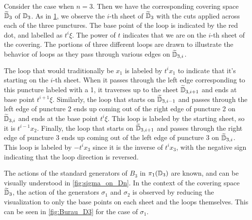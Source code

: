 \begin{example}\label{ex:Burau_D3}
    Consider the case when $n=3$. Then we have the corresponding covering space $\widetilde{\mathbb{D}}_3$ of $\mathbb{D}_3$. As in \cref{fig:D3_cuts}, we observe the $i$-th sheet of $\widetilde{\mathbb{D}}_3$ with the cuts applied across each of the three punctures. The base point of the loop is indicated by the red dot, and labelled as $t^i\xi$. The power of $t$ indicates that we are on the $i$-th sheet of the covering. The portions of three different loops are drawn to illustrate the behavior of loops as they pass through various edges on $\widetilde{\mathbb{D}}_{3,i}$.
    
    The loop that would traditionally be $x_1$ is labeled by $t^i x_1$ to indicate that it's starting on the $i$-th sheet. When it passes through the left edge corresponding to this puncture labeled with a 1, it traverses up to the sheet $\widetilde{\mathbb{D}}_{3,i+1}$ and ends at base point $t^{i+1}\xi$. Similarly, the loop that starts on $\widetilde{\mathbb{D}}_{3,i-1}$ and passes through the left edge of puncture 2 ends up coming out of the right edge of puncture 2 on $\widetilde{\mathbb{D}}_{3,i}$ and ends at the base point $t^i\xi$. This loop is labeled by the starting sheet, so it is $t^{i-1}x_2$. Finally, the loop that starts on $\widetilde{\mathbb{D}}_{3,i+1}$ and passes through the right edge of puncture 3 ends up coming out of the left edge of puncture 3 on $\widetilde{\mathbb{D}}_{3,i}$. This loop is labeled by $-t^{i}x_3$ since it is the inverse of $t^i x_3$, with the negative sign indicating that the loop direction is reversed.
    
    \begin{figure}[htbp]
        \centering
        
        \label{fig:D3_cuts}
    \end{figure}

    
    The actions of the standard generators of $B_3$ in $\pi_1(\mathbb{D}_3)$ are known, and can be visually understood in \cref{fig:sigma_on_Dn}. In the context of the covering space $\widetilde{\mathbb{D}}_3$, the action of the generators $\sigma_1$ and $\sigma_2$ is observed by reducing the visualization to only the base points on each sheet and the loops themselves. This can be seen in \cref{fig:Burau_D3} for the case of $\sigma_1$.


\end{example}
